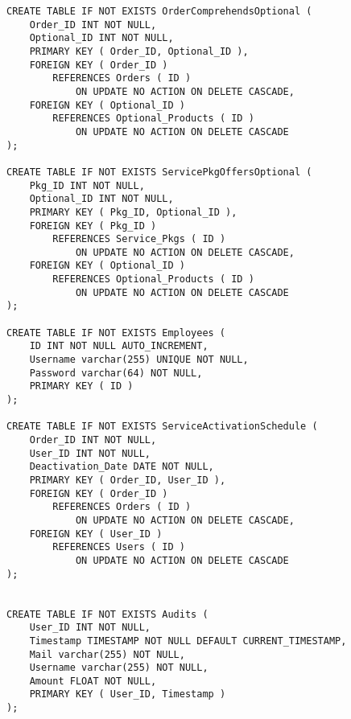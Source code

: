 \begin{lstlisting}[style=SQL]
CREATE TABLE IF NOT EXISTS OrderComprehendsOptional (
    Order_ID INT NOT NULL,
    Optional_ID INT NOT NULL,
    PRIMARY KEY ( Order_ID, Optional_ID ),
    FOREIGN KEY ( Order_ID )
        REFERENCES Orders ( ID )
            ON UPDATE NO ACTION ON DELETE CASCADE,
    FOREIGN KEY ( Optional_ID )
        REFERENCES Optional_Products ( ID )
            ON UPDATE NO ACTION ON DELETE CASCADE
);

CREATE TABLE IF NOT EXISTS ServicePkgOffersOptional (
    Pkg_ID INT NOT NULL,
    Optional_ID INT NOT NULL,
    PRIMARY KEY ( Pkg_ID, Optional_ID ),
    FOREIGN KEY ( Pkg_ID )
        REFERENCES Service_Pkgs ( ID )
            ON UPDATE NO ACTION ON DELETE CASCADE,
    FOREIGN KEY ( Optional_ID )
        REFERENCES Optional_Products ( ID )
            ON UPDATE NO ACTION ON DELETE CASCADE
);

CREATE TABLE IF NOT EXISTS Employees (
    ID INT NOT NULL AUTO_INCREMENT,
    Username varchar(255) UNIQUE NOT NULL,
    Password varchar(64) NOT NULL,
    PRIMARY KEY ( ID )
);

CREATE TABLE IF NOT EXISTS ServiceActivationSchedule (
    Order_ID INT NOT NULL,
    User_ID INT NOT NULL,
    Deactivation_Date DATE NOT NULL,
    PRIMARY KEY ( Order_ID, User_ID ),
    FOREIGN KEY ( Order_ID )
        REFERENCES Orders ( ID )
            ON UPDATE NO ACTION ON DELETE CASCADE,
    FOREIGN KEY ( User_ID )
        REFERENCES Users ( ID )
            ON UPDATE NO ACTION ON DELETE CASCADE
);


CREATE TABLE IF NOT EXISTS Audits (
    User_ID INT NOT NULL,
    Timestamp TIMESTAMP NOT NULL DEFAULT CURRENT_TIMESTAMP,
    Mail varchar(255) NOT NULL,
    Username varchar(255) NOT NULL,
    Amount FLOAT NOT NULL,
    PRIMARY KEY ( User_ID, Timestamp )
);
\end{lstlisting}



